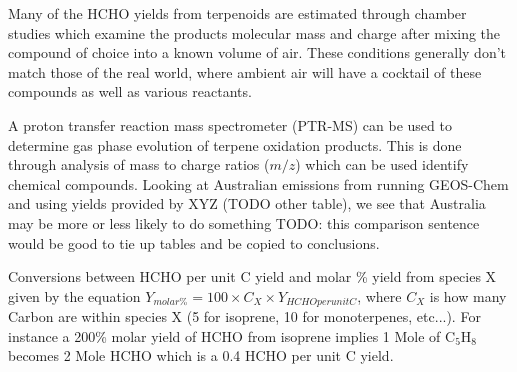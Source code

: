     Many of the HCHO yields from terpenoids are estimated through chamber studies which examine the products molecular mass and charge after mixing the compound of choice into a known volume of air.
    These conditions generally don't match those of the real world, where ambient air will have a cocktail of these compounds as well as various reactants.
    
    A proton transfer reaction mass spectrometer (PTR-MS) can be used to determine gas phase evolution of terpene oxidation products.
    This is done through analysis of mass to charge ratios ($m/z$) which can be used identify chemical compounds.
    Looking at Australian emissions from running GEOS-Chem and using yields provided by XYZ (TODO other table), we see that Australia may be more or less likely to do something TODO: this comparison sentence would be good to tie up tables and be copied to conclusions.
    
    Conversions between HCHO per unit C yield and molar \% yield from species X given by the equation $ Y_{molar \%} = 100 \times C_X \times Y_{HCHO per unit C} $, where $C_X$ is how many Carbon are within species X (5 for isoprene, 10 for monoterpenes, etc...).
    For instance a 200\% molar yield of HCHO from isoprene implies 1 Mole of C$_5$H$_8$ becomes 2 Mole HCHO which is a 0.4 HCHO per unit C yield.
    
